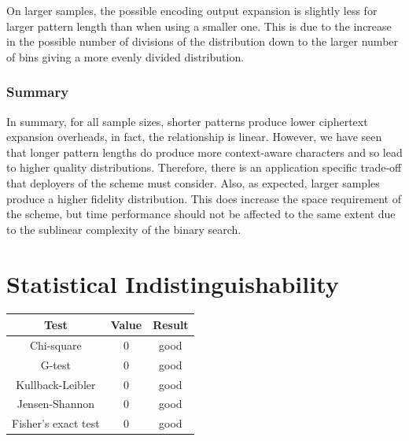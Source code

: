 \documentclass[ %
                    author={Samuel Russell},
                supervisor={Prof. Bogdan Warinschi},
                    degree={MEng},
                     title={Innocuous Ciphertexts},
                  subtitle={The DE-CENSOR Scheme},
                      type={research},
                      year={2018} ]{dissertation}
\begin{document}
On larger samples, the possible encoding output expansion is slightly less for larger pattern length than when using a smaller one. This is due to the increase in the possible number of divisions of the distribution down to the larger number of bins giving a more evenly divided distribution.

\subsubsection{Summary}

In summary, for all sample sizes, shorter patterns produce lower ciphertext expansion overheads, in fact, the relationship is linear.
However, we have seen that longer pattern lengths do produce more context-aware characters and so lead to higher quality distributions.
Therefore, there is an application specific trade-off that deployers of the scheme must consider.
Also, as expected, larger samples produce a higher fidelity distribution.
This does increase the space requirement of the scheme, but time performance should not be affected to the same extent due to the sublinear complexity of the binary search.

\section{Statistical Indistinguishability}

\begin{table}[h]
\centering
\begin{tabular}{|c|c|c|}

\hline

Test					& Value		& Result\\

\hline

Chi-square				& 0			& good\\

G-test					& 0			& good\\

Kullback-Leibler		& 0			& good\\

Jensen-Shannon			& 0			& good\\

Fisher's exact test		& 0			& good\\

\hline

\end{tabular}

\end{table}
\end{document}
